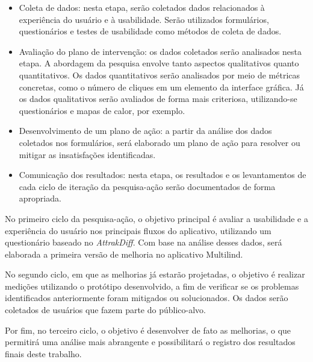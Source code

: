\begin{itemize}
	\item Coleta de dados: nesta etapa, serão coletados dados relacionados à experiência do usuário e à usabilidade. Serão utilizados formulários, questionários e testes de usabilidade como métodos de coleta de dados.
	\item Avaliação do plano de intervenção: os dados coletados serão analisados nesta etapa. A abordagem da pesquisa envolve tanto aspectos qualitativos quanto quantitativos. Os dados quantitativos serão analisados por meio de métricas concretas, como o número de cliques em um elemento 
	da interface gráfica. Já os dados qualitativos serão avaliados de forma mais criteriosa, utilizando-se questionários e mapas de calor, por exemplo.
	\item Desenvolvimento de um plano de ação: a partir da análise dos dados coletados nos formulários, será elaborado um plano de ação para resolver ou mitigar as insatisfações identificadas.
	\item Comunicação dos resultados: nesta etapa, os resultados e os levantamentos de cada ciclo de iteração da pesquisa-ação serão documentados de forma apropriada.
\end{itemize}

No primeiro ciclo da pesquisa-ação, o objetivo principal é avaliar a usabilidade e a experiência do usuário nos principais fluxos do aplicativo, utilizando um questionário baseado no \textit{AttrakDiff}. Com base na análise desses dados, será elaborada a primeira versão de melhoria no aplicativo Multilind.

No segundo ciclo, em que as melhorias já estarão projetadas, o objetivo é realizar medições utilizando o protótipo desenvolvido, a fim de verificar se os problemas identificados anteriormente foram mitigados ou solucionados. Os dados serão 
coletados de usuários que fazem parte do público-alvo.

Por fim, no terceiro ciclo, o objetivo é desenvolver de fato as melhorias, o que permitirá uma análise mais abrangente e possibilitará o registro dos resultados finais deste trabalho.

